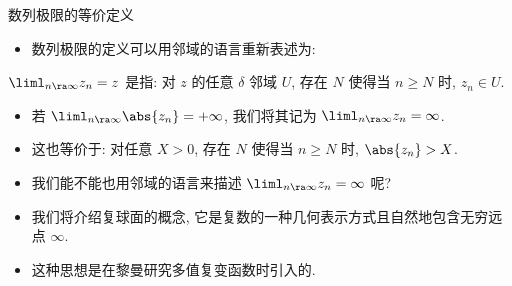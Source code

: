 \begin{frame}{数列极限的等价定义\noexer}
	\begin{itemize}
		\item 数列极限的定义可以用邻域的语言重新表述为:
	\end{itemize}
	\onslide<+->
	\begin{definition}
		$\liml_{n\ra\infty}z_n=z$ 是指: 对 $z$ 的任意 $\delta$ 邻域 $U$, 存在 $N$ 使得当 $n\ge N$ 时, $z_n\in U$.
	\end{definition}
	\begin{itemize}
		\item 若 $\liml_{n\ra\infty}\abs{z_n}=+\infty$, 我们将其记为 \emph{$\liml_{n\ra\infty}z_n=\infty$}.
		\item 这也等价于: 对任意 $X>0$, 存在 $N$ 使得当 $n\ge N$ 时, $\abs{z_n}>X$.
		\item 我们能不能也用邻域的语言来描述 $\liml_{n\ra\infty}z_n=\infty$ 呢?
		\item 我们将介绍复球面的概念, 它是复数的一种几何表示方式且自然地包含无穷远点 $\infty$.
		\item 这种思想是在黎曼研究多值复变函数时引入的.
	\end{itemize}
\end{frame}


